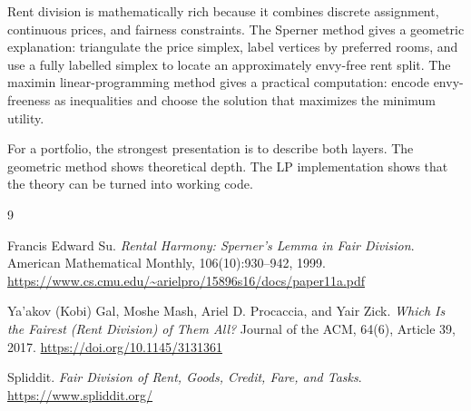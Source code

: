 \documentclass[11pt]{article}
\begin{document}
Rent division is mathematically rich because it combines discrete assignment, continuous prices, and fairness constraints. The Sperner method gives a geometric explanation: triangulate the price simplex, label vertices by preferred rooms, and use a fully labelled simplex to locate an approximately envy-free rent split. The maximin linear-programming method gives a practical computation: encode envy-freeness as inequalities and choose the solution that maximizes the minimum utility.

For a portfolio, the strongest presentation is to describe both layers. The geometric method shows theoretical depth. The LP implementation shows that the theory can be turned into working code.

\begin{thebibliography}{9}

Francis Edward Su.
\newblock \emph{Rental Harmony: Sperner's Lemma in Fair Division}.
\newblock American Mathematical Monthly, 106(10):930--942, 1999.
\newblock \url{https://www.cs.cmu.edu/~arielpro/15896s16/docs/paper11a.pdf}

Ya'akov (Kobi) Gal, Moshe Mash, Ariel D. Procaccia, and Yair Zick.
\newblock \emph{Which Is the Fairest (Rent Division) of Them All?}
\newblock Journal of the ACM, 64(6), Article 39, 2017.
\newblock \url{https://doi.org/10.1145/3131361}

Spliddit.
\newblock \emph{Fair Division of Rent, Goods, Credit, Fare, and Tasks}.
\newblock \url{https://www.spliddit.org/}

\end{thebibliography}
\end{document}
